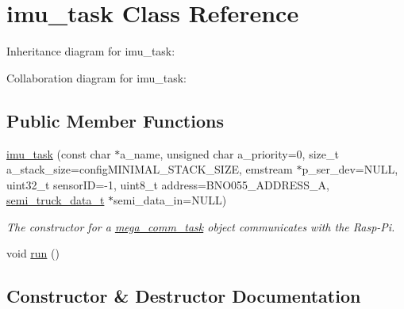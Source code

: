 \hypertarget{classimu__task}{}\section{imu\+\_\+task Class Reference}
\label{classimu__task}


Inheritance diagram for imu\+\_\+task\+:


Collaboration diagram for imu\+\_\+task\+:
\subsection*{Public Member Functions}
\begin{DoxyCompactItemize}
\item 
\hyperlink{classimu__task_ad78399d5e32f9cc5603c1153d0f37143}{imu\+\_\+task} (const char $\ast$a\+\_\+name, unsigned char a\+\_\+priority=0, size\+\_\+t a\+\_\+stack\+\_\+size=config\+M\+I\+N\+I\+M\+A\+L\+\_\+\+S\+T\+A\+C\+K\+\_\+\+S\+I\+ZE, emstream $\ast$p\+\_\+ser\+\_\+dev=N\+U\+LL, uint32\+\_\+t sensor\+ID=-\/1, uint8\+\_\+t address=B\+N\+O055\+\_\+\+A\+D\+D\+R\+E\+S\+S\+\_\+A, \hyperlink{structsemi__truck__data__t}{semi\+\_\+truck\+\_\+data\+\_\+t} $\ast$semi\+\_\+data\+\_\+in=N\+U\+LL)
\begin{DoxyCompactList}\small\item\em The constructor for a \hyperlink{classmega__comm__task}{mega\+\_\+comm\+\_\+task} object communicates with the Rasp-\/\+Pi. \end{DoxyCompactList}\item 
void \hyperlink{classimu__task_a482728903a7fda5facb8dcdc5f6b9f46}{run} ()
\end{DoxyCompactItemize}


\subsection{Constructor \& Destructor Documentation}
